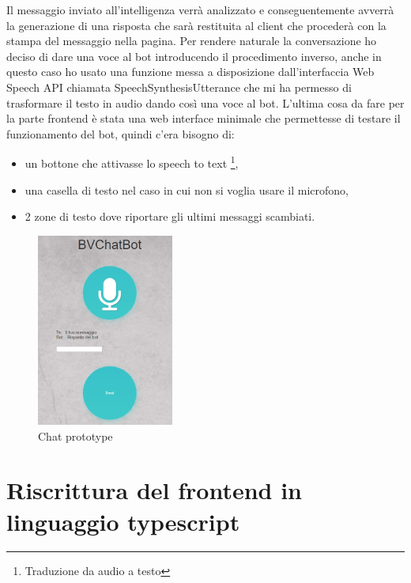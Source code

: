 Il messaggio inviato all'intelligenza verrà analizzato e conseguentemente avverrà la generazione di una risposta che sarà restituita al client che procederà con la stampa del messaggio nella pagina.
Per rendere naturale la conversazione ho deciso di dare una voce al bot introducendo il procedimento inverso, anche in questo caso ho usato una funzione messa a disposizione dall'interfaccia Web Speech API chiamata SpeechSynthesisUtterance che mi ha permesso di trasformare il testo in audio dando così una voce al bot.
L'ultima cosa da fare per la parte frontend è stata una web interface minimale che permettesse di testare il funzionamento del bot, quindi c'era bisogno di:
\begin{itemize}
\item un bottone che attivasse lo speech to text \footnote{Traduzione da audio a testo},
\item una casella di testo nel caso in cui non si voglia usare il microfono,
\item 2 zone di testo dove riportare gli ultimi messaggi scambiati.
\end{itemize}
\begin{figure}[H]
 \centering
  \includegraphics[width=0.4\textwidth]{img/prototype.png}
 \caption{Chat prototype}
\end{figure}

\section{Riscrittura del frontend in linguaggio typescript}

